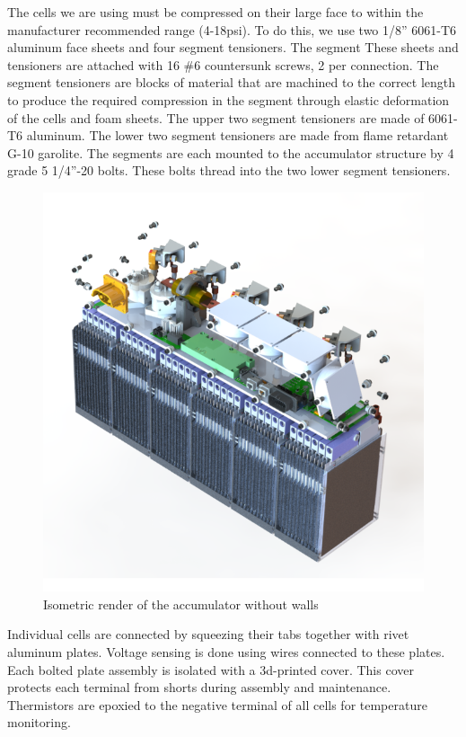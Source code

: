 \documentclass{article}
\begin{document}
The cells we are using must be compressed on their large face to within the manufacturer recommended range (4-18psi). To do this, we use two 1/8'' 6061-T6 aluminum face sheets and four segment tensioners. The segment  These sheets and tensioners are attached with 16 \#6 countersunk screws, 2 per connection. The segment tensioners are blocks of material that are machined to the correct length to produce the required compression in the segment through elastic deformation of the cells and foam sheets. The upper two segment tensioners are made of 6061-T6 aluminum. The lower two segment tensioners are made from flame retardant G-10 garolite. The segments are each mounted to the accumulator structure by 4 grade 5 1/4''-20 bolts. These bolts thread into the two lower segment tensioners.

\begin{figure}[H]
\centering
\includegraphics[width=1\textwidth]{accumulator_2_iso_naked}
\caption{Isometric render of the accumulator without walls}
\label{fig:cell_stack}
\end{figure}


Individual cells are connected by squeezing their tabs together with rivet aluminum plates. Voltage sensing is done using wires connected to these plates. Each bolted plate assembly is isolated with a 3d-printed cover. This cover protects each terminal from shorts during assembly and maintenance. Thermistors are epoxied to the negative terminal of all cells for temperature monitoring.
\end{document}
